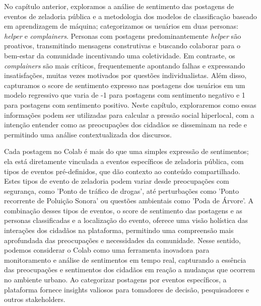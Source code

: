 No capítulo anterior, exploramos a análise de sentimento das postagens de eventos de zeladoria pública e a metodologia dos modelos de classificação baseado em aprendizagem de máquina; categorizamos os usuários em duas personas: \textit{helper} e \textit{complainers}. Personas com postagens predominantemente \textit{helper} são proativos, transmitindo mensagens construtivas e buscando colaborar para o bem-estar da comunidade incentivando uma coletividade. Em contraste, os \textit{complainers} são mais críticos, frequentemente apontando falhas e expressando insatisfações, muitas vezes motivados por questões individualistas. Além disso, capturamos o score de sentimento expresso nas postagens dos usuários em um modelo regressivo que varia de -1 para postagens com sentimento negativo e 1 para postagens com sentimento positivo. Neste capítulo, exploraremos como essas informações podem ser utilizadas para calcular a pressão social hiperlocal, com a intenção entender como as preocupações dos cidadãos se disseminam na rede e permitindo uma análise contextualizada dos discursos.

Cada postagem no Colab é mais do que uma simples expressão de sentimentos; ela está diretamente vinculada a eventos específicos de zeladoria pública, com tipos de eventos pré-definidos, que dão contexto ao conteúdo compartilhado. Estes tipos de evento de zeladoria podem variar desde preocupações com segurança, como 'Ponto de tráfico de drogas', até perturbações como 'Ponto recorrente de Poluição Sonora' ou questões ambientais como 'Poda de Árvore'. A combinação desses tipos de eventos, o score de sentimento das postagens e as personas classificadas e a localização do evento, oferece uma visão holística das interações dos cidadãos na plataforma, permitindo uma compreensão mais aprofundada das preocupações e necessidades da comunidade. Nesse sentido, podemos considerar o Colab como uma ferramenta inovadora para monitoramento e análise de sentimentos em tempo real, capturando a essência das preocupações e sentimentos dos cidadãos em reação a mudanças que ocorrem no ambiente urbano. Ao categorizar postagens por eventos específicos, a plataforma fornece insights valiosos para tomadores de decisão, pesquisadores e outros stakeholders.

